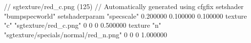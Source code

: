 // sgtexture/red_c.png (125)
// Automatically generated using cfgfix
setshader "bumpspecworld"
setshaderparam "specscale" 0.200000 0.100000 0.100000
texture "c" "sgtexture/red_c.png" 0 0 0 0.500000
texture "n" "sgtexture/specials/normal/red_n.png" 0 0 0 1.000000
